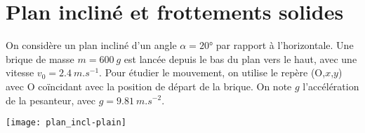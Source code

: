 \documentclass[a4paper, 12pt, final, garamond]{book}
\begin{document}
\section{Plan incliné et frottements solides}
\begin{minipage}{0.6\linewidth}
    On considère un plan incliné d'un angle $\alpha = \ang{20;;}$ par rapport à
    l'horizontale. Une brique de masse $m = \SI{600}{g}$ est lancée depuis le
    bas du plan vers le haut, avec une vitesse $v_0 = \SI{2.4}{m.s^{-1}}$. Pour
    étudier le mouvement, on utilise le repère (O,$x$,$y$) avec O coïncidant
    avec la position de départ de la brique. On note $g$ l'accélération de la
    pesanteur, avec $g = \SI{9.81}{m.s^{-2}}$. \bigbreak
\end{minipage}
\hfill
\begin{minipage}{0.35\linewidth}
    \begin{center}
        \texttt{[image: plan\_incl-plain]}
    \end{center}
\end{minipage}
\end{document}
